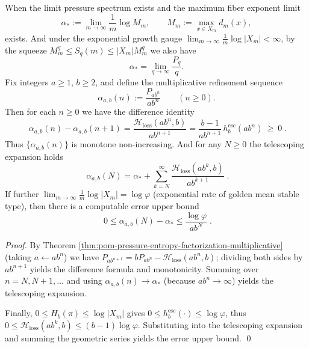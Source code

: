 \begin{theorem}\label{thm:pom-multiplicative-refinement-telescope-alpha}
When the limit pressure spectrum exists and the maximum fiber exponent limit
\[
\alpha_\ast:=\lim_{m\to\infty}\frac{1}{m}\log M_m,
\qquad
M_m:=\max_{x\in X_m}d_m(x),
\]
exists. And under the exponential growth gauge \(\lim_{m\to\infty}\frac{1}{m}\log|X_m|<\infty\), by the squeeze \(M_m^q\le S_q(m)\le |X_m|M_m^q\) we also have
\[
\alpha_\ast=\lim_{q\to\infty}\frac{P_q}{q}.
\]
Fix integers \(a\ge 1\), \(b\ge 2\), and define the multiplicative refinement sequence
\[
\alpha_{a,b}(n):=\frac{P_{ab^n}}{ab^n}\qquad(n\ge 0).
\]
Then for each \(n\ge 0\) we have the difference identity
\[
\boxed{\;
\alpha_{a,b}(n)-\alpha_{a,b}(n+1)
=\frac{\mathcal{H}_{\mathrm{loss}}(ab^n,b)}{ab^{n+1}}
=\frac{b-1}{ab^{n+1}}\,h^{\mathrm{esc}}_{b}(ab^n)\ \ge\ 0\; }.
\]
Thus \(\{\alpha_{a,b}(n)\}\) is monotone non-increasing.
And for any \(N\ge 0\) the telescoping expansion holds
\[
\boxed{\;
\alpha_{a,b}(N)
=
\alpha_\ast+\sum_{k=N}^{\infty}\frac{\mathcal{H}_{\mathrm{loss}}(ab^k,b)}{ab^{k+1}}\; }.
\]
If further \(\lim_{m\to\infty}\frac{1}{m}\log|X_m|=\log\varphi\) (exponential rate of golden mean stable type), then there is a computable error upper bound
\[
\boxed{\;
0\le \alpha_{a,b}(N)-\alpha_\ast\le \frac{\log\varphi}{ab^N}\; }.
\]
\end{theorem}
\begin{proof}
By Theorem \ref{thm:pom-pressure-entropy-factorization-multiplicative} (taking \(a\leftarrow ab^n\)) we have
\(
P_{ab^{n+1}}=bP_{ab^n}-\mathcal{H}_{\mathrm{loss}}(ab^n,b)
\);
dividing both sides by \(ab^{n+1}\) yields the difference formula and monotonicity.
Summing over \(n=N,N+1,\dots\) and using \(\alpha_{a,b}(n)\to \alpha_\ast\) (because \(ab^n\to\infty\)) yields the telescoping expansion.
\par
Finally, \(0\le H_b(\pi)\le \log|X_m|\) gives
\(
0\le h^{\mathrm{esc}}_b(\cdot)\le \log\varphi
\), thus
\(
0\le \mathcal{H}_{\mathrm{loss}}(ab^k,b)\le (b-1)\log\varphi
\).
Substituting into the telescoping expansion and summing the geometric series yields the error upper bound. \qed
\end{proof}

